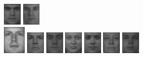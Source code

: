 \begin{figure}[hbt]
  \includegraphics[width=0.08\textwidth]{../results/H_rez/incorrect95/1/9.jpg}
  \includegraphics[width=0.08\textwidth]{../results/H_rez/incorrect95/1/10.jpg} \\
  \vspace{4pt}
  \includegraphics[width=0.1\textwidth]{../results/H_rez/incorrect95/2/testImg.jpg} \vline
  \hspace{2pt}
  \includegraphics[width=0.08\textwidth]{../results/H_rez/incorrect95/2/1.jpg}
  \includegraphics[width=0.08\textwidth]{../results/H_rez/incorrect95/2/2.jpg}
  \includegraphics[width=0.08\textwidth]{../results/H_rez/incorrect95/2/3.jpg}
  \includegraphics[width=0.08\textwidth]{../results/H_rez/incorrect95/2/4.jpg}
  \includegraphics[width=0.08\textwidth]{../results/H_rez/incorrect95/2/5.jpg}
  \includegraphics[width=0.08\textwidth]{../results/H_rez/incorrect95/2/6.jpg}

\end{figure}
